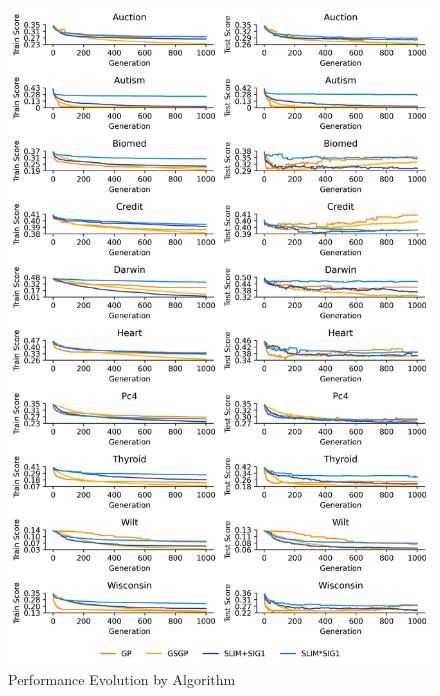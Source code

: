 
    \begin{figure}[H]
    \centering
    \includegraphics[width=\linewidth]{../Latex/Chapters/Figures/Results/comparison_performance_evolution.png}
    \caption{Performance Evolution by Algorithm}
    \label{fig:comparison_performance_evolution}
    \end{figure}
    